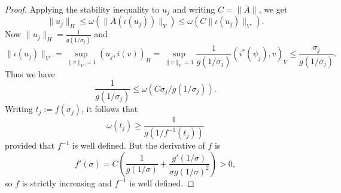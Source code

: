 \documentclass[12pt,twoside]{amsart}
\numberwithin{equation}{section}
\renewcommand{\leq}{\leqslant}
\renewcommand{\geq}{\geqslant}
\newcommand{\norm}[1]{\lVert #1 \rVert}         %
\begin{document}
\begin{appendix}
\begin{proof}
Applying the stability inequality to $u_j$ and writing $C = \norm{\bar{A}}$, we get 
\[
\norm{u_j}_H \leq \omega(\norm{\bar{A}(\iota(u_j))}_Y) \leq \omega(C \norm{\iota(u_j)}_{V'}).
\]
Now $\norm{u_j}_H = \frac{1}{g(1/\sigma_j)}$ and 
\[
\norm{\iota(u_j)}_{V'} = \sup_{\norm{v}_V=1} (u_j, i(v))_H = \sup_{\norm{v}_V=1} \frac{1}{g(1/\sigma_j)} (i^*(\psi_j), v)_V \leq \frac{\sigma_j}{g(1/\sigma_j)}.
\]
Thus we have 
\[
\frac{1}{g(1/\sigma_j)} \leq \omega(C \sigma_j/g(1/\sigma_j)).
\]
Writing $t_j := f(\sigma_j)$, it follows that 
\[
\omega(t_j) \geq \frac{1}{g(1/f^{-1}(t_j))}
\]
provided that $f^{-1}$ is well defined. But the derivative of $f$ is 
\[
f'(\sigma) = C \left( \frac{1}{g(1/\sigma)} + \frac{g'(1/\sigma)}{\sigma g(1/\sigma)^2} \right) > 0,
\]
so $f$ is strictly increasing and $f^{-1}$ is well defined.
\end{proof}


\end{appendix}
\end{document}

